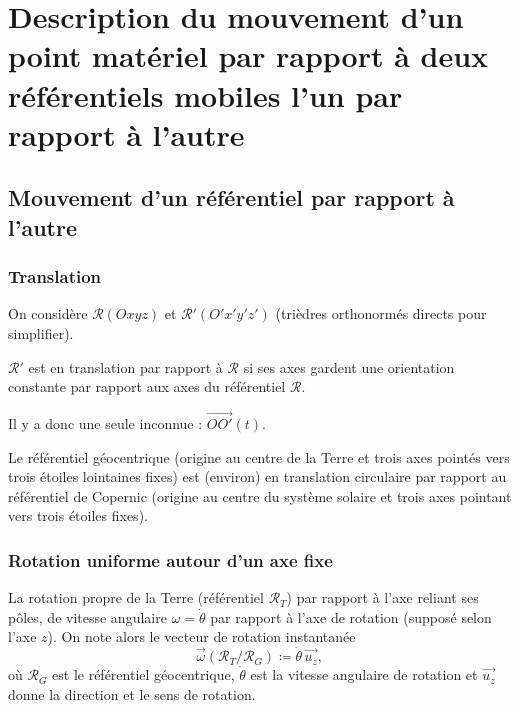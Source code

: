 \section[Description du mouvement d'un point matériel]{Description du mouvement d'un point matériel par rapport à deux référentiels mobiles l'un par rapport à l'autre}

    \subsection{Mouvement d'un référentiel par rapport à l'autre}

        \subsubsection{Translation}

            On considère $\mathcal{R}(Oxyz)$ et $\mathcal{R}'(O'x'y'z')$ (trièdres orthonormés directs pour simplifier).

            \begin{definition}
                $\mathcal{R}'$ est en translation par rapport à $\mathcal{R}$ si ses axes gardent une orientation constante par rapport aux axes du référentiel $\mathcal{R}$.
            \end{definition}

            Il y a donc une seule inconnue : $\vec{OO'}(t)$.

            \begin{example}
                Le référentiel géocentrique (origine au centre de la Terre et trois axes pointés vers trois étoiles lointaines \og fixes\fg) est (environ) en translation circulaire par rapport au référentiel de Copernic (origine au centre du système solaire et trois axes pointant vers trois étoiles \og fixes\fg).
            \end{example}

        \subsubsection{Rotation uniforme autour d'un axe fixe}
            
            \begin{example}
                La rotation propre de la Terre (référentiel $\mathcal{R}_{T}$) par rapport à l'axe reliant ses pôles, de vitesse angulaire $\omega=\dot{\theta}$ par rapport à l'axe de rotation (supposé selon l'axe $z$). On note alors le vecteur de rotation instantanée
                \begin{equation*}
                    \vec{\omega}(\mathcal{R}_{T}/\mathcal{R}_{G})\coloneqq \dot{\theta}\,\vec{u_z},
                \end{equation*}
                où $\mathcal{R}_{G}$ est le référentiel géocentrique, $\dot{\theta}$ est la vitesse angulaire de rotation et $\vec{u_z}$ donne la direction et le sens de rotation.
            \end{example}

